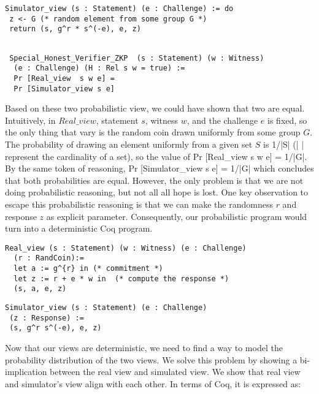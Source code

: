 \begin{verbatim}
Simulator_view (s : Statement) (e : Challenge) := do
 z <- G (* random element from some group G *)
 return (s, g^r * s^(-e), e, z)
\end{verbatim}

\begin{verbatim}

 Special_Honest_Verifier_ZKP  (s : Statement) (w : Witness) 
  (e : Challenge) (H : Rel s w = true) := 
  Pr [Real_view  s w e] = 
  Pr [Simulator_view s e]

\end{verbatim}

\noindent
Based on these two probabilistic view, we could have shown that two are equal. Intuitively, 
in $Real\_view$, statement $s$, witness $w$, and the challenge $e$ is fixed, so the only thing that vary is the
random coin drawn uniformly from some group $G$. The probability of drawing an element uniformly 
from a given set $S$ is 1/|S| (| | represent the cardinality of a set), so the value of Pr [Real\_view  s w e] = 1/|G|. 
By the same token of reasoning, Pr [Simulator\_view s e] = 1/|G| which concludes that 
both probabilities are equal. However, the only problem is that we are not doing probabilistic reasoning, 
but not all all hope is lost.
One key observation to escape this probabilistic reasoning is 
that we can make the randomness $r$ and response $z$ as 
explicit parameter. Consequently, our probabilistic program would turn into 
a deterministic Coq program. 


\begin{verbatim}
Real_view (s : Statement) (w : Witness) (e : Challenge) 
  (r : RandCoin):=
  let a := g^{r} in (* commitment *)
  let z := r + e * w in  (* compute the response *)
  (s, a, e, z)
\end{verbatim}


\begin{verbatim}
Simulator_view (s : Statement) (e : Challenge) 
 (z : Response) :=
 (s, g^r s^(-e), e, z)

\end{verbatim}



Now that our views are deterministic, we need to find a way to model 
the probability distribution of the two views. We solve this problem 
by showing a bi-implication  between  the real view and simulated view.
We show that real view and simulator's view align with each other. 
In terms of Coq, it is expressed as:

